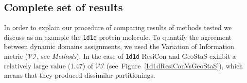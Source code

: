 \documentclass[a4paper,11pt,twoside]{book}%
\begin{document}
\begin{appendices}
\section{Complete set of results}

In order to explain our procedure of comparing results of methods tested we discuss as an example the \texttt{1d1d} protein molecule.
To quantify the agreement between dynamic domains assignments, we used the Variation of Information metric ($\mathcal{VI}$, see \emph{Methods}).
In the case of \texttt{1d1d} ResiCon and GeoStaS exhibit a relatively large value (1.47) of $\mathcal{VI}$ (see~Figure~\ref{1d1dResiConVsGeoStaS}), which means that they produced dissimilar partitionings.

\begin{figure}[h!]
\setlength{\fboxsep}{0.3pt}
\setlength{\fboxrule}{0.5pt}
\hspace{0.2cm}%
\begin{minipage}{\linewidth}
\begin{minipage}{0.9\linewidth}
\begin{minipage}{\linewidth}
\end{minipage}


\end{minipage}
\end{minipage}
\end{figure}
\end{appendices}
\end{document}
